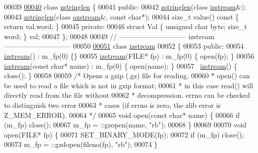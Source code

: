 \begin{DoxyCode}
00039 
\hyperlink{classzstringlen}{00040} \textcolor{keyword}{class }\hyperlink{classzstringlen}{zstringlen} \{
00041 \textcolor{keyword}{public}:
00042     \hyperlink{classzstringlen}{zstringlen}(\textcolor{keyword}{class} \hyperlink{classizstream}{izstream}&);
00043     \hyperlink{classzstringlen}{zstringlen}(\textcolor{keyword}{class} \hyperlink{classozstream}{ozstream}&, \textcolor{keyword}{const} \textcolor{keywordtype}{char}*);
00044     \textcolor{keywordtype}{size\_t} value()\textcolor{keyword}{ const }\{ \textcolor{keywordflow}{return} val.word; \}
00045 \textcolor{keyword}{private}:
00046     \textcolor{keyword}{struct }Val \{ \textcolor{keywordtype}{unsigned} \textcolor{keywordtype}{char} byte; \textcolor{keywordtype}{size\_t} word; \} val;
00047 \};
00048 
00049 \textcolor{comment}{//  ----------------------------- izstream -----------------------------}
00050 
\hyperlink{classizstream}{00051} \textcolor{keyword}{class }\hyperlink{classizstream}{izstream}
00052 \{
00053     \textcolor{keyword}{public}:
00054         \hyperlink{classizstream}{izstream}() : m\_fp(0) \{\}
00055         \hyperlink{classizstream}{izstream}(FILE* fp) : m\_fp(0) \{ open(fp); \}
00056         \hyperlink{classizstream}{izstream}(\textcolor{keyword}{const} \textcolor{keywordtype}{char}* name) : m\_fp(0) \{ open(name); \}
00057         ~\hyperlink{classizstream}{izstream}() \{ close(); \}
00058 
00059         \textcolor{comment}{/* Opens a gzip (.gz) file for reading.}
00060 \textcolor{comment}{         * open() can be used to read a file which is not in gzip format;}
00061 \textcolor{comment}{         * in this case read() will directly read from the file without}
00062 \textcolor{comment}{         * decompression. errno can be checked to distinguish two error}
00063 \textcolor{comment}{         * cases (if errno is zero, the zlib error is Z\_MEM\_ERROR).}
00064 \textcolor{comment}{         */}
00065         \textcolor{keywordtype}{void} open(\textcolor{keyword}{const} \textcolor{keywordtype}{char}* name) \{
00066             \textcolor{keywordflow}{if} (m\_fp) close();
00067             m\_fp = ::gzopen(name, \textcolor{stringliteral}{"rb"});
00068         \}
00069 
00070         \textcolor{keywordtype}{void} open(FILE* fp) \{
00071             SET\_BINARY\_MODE(fp);
00072             \textcolor{keywordflow}{if} (m\_fp) close();
00073             m\_fp = ::gzdopen(fileno(fp), \textcolor{stringliteral}{"rb"});
00074         \}

\end{DoxyCode}
